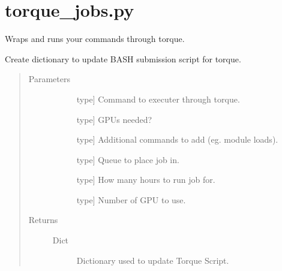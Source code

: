 \documentclass[letterpaper,10pt,english]{sphinxmanual}
\begin{document}
\label{\detokenize{index:module-methylnet.torque_jobs}}

\chapter{torque\_jobs.py}
\label{\detokenize{index:torque-jobs-py}}
Wraps and runs your commands through torque.

\begin{fulllineitems}
\label{\detokenize{index:methylnet.torque_jobs.assemble_replace_dict}}
Create dictionary to update BASH submission script for torque.
\begin{quote}\begin{description}
\item[{Parameters}] \leavevmode\begin{description}
\item[{}] \leavevmode{[}type{]}
Command to executer through torque.

\item[{}] \leavevmode{[}type{]}
GPUs needed?

\item[{}] \leavevmode{[}type{]}
Additional commands to add (eg. module loads).

\item[{}] \leavevmode{[}type{]}
Queue to place job in.

\item[{}] \leavevmode{[}type{]}
How many hours to run job for.

\item[{}] \leavevmode{[}type{]}
Number of GPU to use.

\end{description}

\item[{Returns}] \leavevmode\begin{description}
\item[{Dict}] \leavevmode
Dictionary used to update Torque Script.

\end{description}

\end{description}\end{quote}

\end{fulllineitems}
\end{document}

